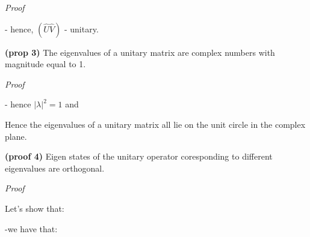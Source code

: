 \documentclass{article}
\begin{document}
\textit{Proof}


- hence, $(\hat{U}\hat{V})$ - unitary.


\textbf{(prop 3)} The eigenvalues of a unitary matrix are complex numbers with magnitude equal to 1.

\textit{Proof}



- hence $\vert \lambda \vert^2 = 1$ and 


Hence the eigenvalues of a unitary matrix all lie on the unit circle in the complex plane.


\textbf{(proof 4)} Eigen states of the unitary operator coresponding to different eigenvalues are orthogonal.

\textit{Proof}

Let's show that:


-we have that:

\end{document}

